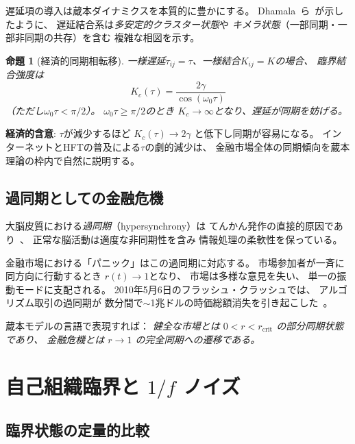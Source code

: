\documentclass[12pt,twocolumn]{ltjsarticle}
\newtheorem{proposition}[theorem]{命題}
\begin{document}
遅延項の導入は蔵本ダイナミクスを本質的に豊かにする。
Dhamala~ら~\cite{Dhamala2004}が示したように、
遅延結合系は\emph{多安定的クラスター状態}や
\emph{キメラ状態}（一部同期・一部非同期の共存）を含む
複雑な相図を示す。

\begin{proposition}[経済的同期相転移]
\label{prop:sync}
一様遅延$\tau_{ij} = \tau$、一様結合$K_{ij} = K$の場合、
臨界結合強度は
\begin{equation}
K_c(\tau) = \frac{2\gamma}{\cos(\omega_0 \tau)}
\label{eq:critical_coupling}
\end{equation}
（ただし$\omega_0 \tau < \pi/2$）。
$\omega_0 \tau \geq \pi/2$のとき
$K_c \to \infty$となり、遅延が同期を妨げる。
\end{proposition}

\textbf{経済的含意}:
$\tau$が減少するほど $K_c(\tau) \to 2\gamma$ と低下し同期が容易になる。
インターネットとHFTの普及による$\tau$の劇的減少は、
金融市場全体の同期傾向を蔵本理論の枠内で自然に説明する。

\subsection{過同期としての金融危機}

大脳皮質における\emph{過同期}（hypersynchrony）は
てんかん発作の直接的原因であり~\cite{Jiruska2013}、
正常な脳活動は適度な非同期性を含み
情報処理の柔軟性を保っている。

金融市場における「パニック」はこの過同期に対応する。
市場参加者が一斉に同方向に行動するとき
$r(t) \to 1$となり、
市場は多様な意見を失い、
単一の振動モードに支配される。
2010年5月6日のフラッシュ・クラッシュでは、
アルゴリズム取引の過同期が
数分間で$\sim$1兆ドルの時価総額消失を引き起こした~\cite{Kirilenko2017}。

蔵本モデルの言語で表現すれば：
\emph{健全な市場とは $0 < r < r_{\text{crit}}$ の部分同期状態であり、
金融危機とは $r \to 1$ の完全同期への遷移である。}


\section{自己組織臨界と $1/f$ ノイズ}
\label{sec:soc}

\subsection{臨界状態の定量的比較}
\end{document}
